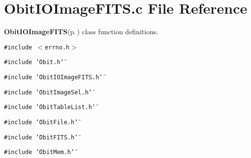 \section{Obit\-IOImage\-FITS.c File Reference}
\label{ObitIOImageFITS_8c}
{\bf Obit\-IOImage\-FITS}{\rm (p.\,\pageref{structObitIOImageFITS})} class function definitions. 

{\tt \#include $<$errno.h$>$}\par
{\tt \#include \char`\"{}Obit.h\char`\"{}}\par
{\tt \#include \char`\"{}Obit\-IOImage\-FITS.h\char`\"{}}\par
{\tt \#include \char`\"{}Obit\-Image\-Sel.h\char`\"{}}\par
{\tt \#include \char`\"{}Obit\-Table\-List.h\char`\"{}}\par
{\tt \#include \char`\"{}Obit\-File.h\char`\"{}}\par
{\tt \#include \char`\"{}Obit\-FITS.h\char`\"{}}\par
{\tt \#include \char`\"{}Obit\-Mem.h\char`\"{}}\par
